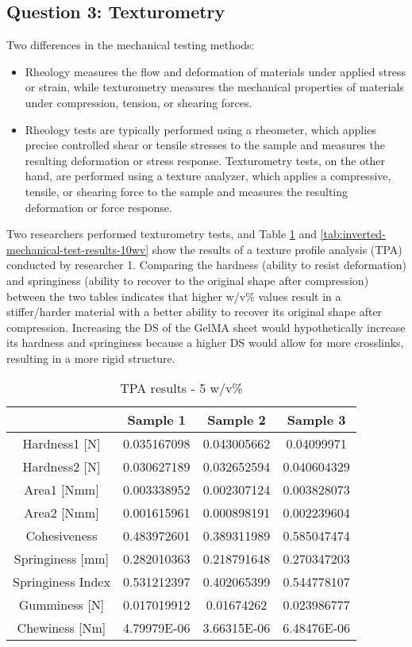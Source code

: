 \subsection{Question 3: Texturometry}

Two differences in the mechanical testing methods:
\begin{itemize}
    \item[1.] Rheology measures the flow and deformation of materials under applied stress or strain, while texturometry 
    measures the mechanical properties of materials under compression, tension, or shearing forces.
    \item[2.] Rheology tests are typically performed using a rheometer, which applies precise controlled shear or tensile 
    stresses to the sample and measures the resulting deformation or stress response. Texturometry tests, on the other 
    hand, are performed using a texture analyzer, which applies a compressive, tensile, or shearing force to the sample and measures the resulting deformation or force response.
\end{itemize}

Two researchers performed texturometry tests, and Table \ref{tab:inverted-mechanical-test-results} and \ref{tab:inverted-mechanical-test-results-10wv} show the results of a texture profile analysis (TPA) conducted by researcher 1. Comparing the hardness (ability to resist deformation) and springiness (ability to recover to the original shape after compression) between the two tables indicates that higher w/v\% values result in a stiffer/harder material with a better ability to recover its original shape after compression. Increasing the DS of the GelMA sheet would hypothetically increase its hardness and springiness because a higher DS would allow for more crosslinks, resulting in a more rigid structure.

\begin{table}[ht]
    \centering
    \begin{tabular}{c|ccc}
    \hline
    & Sample 1 & Sample 2 & Sample 3 \\ \hline
    Hardness1 [N] & 0.035167098 & 0.043005662 & 0.04099971 \\ 
    Hardness2 [N] & 0.030627189 & 0.032652594 & 0.040604329 \\ 
    Area1 [Nmm] & 0.003338952 & 0.002307124 & 0.003828073 \\ 
    Area2 [Nmm] & 0.001615961 & 0.000898191 & 0.002239604 \\ 
    Cohesiveness & 0.483972601 & 0.389311989 & 0.585047474 \\ 
    Springiness [mm] & 0.282010363 & 0.218791648 & 0.270347203 \\ 
    Springiness Index & 0.531212397 & 0.402065399 & 0.544778107 \\ 
    Gumminess [N] & 0.017019912 & 0.01674262 & 0.023986777 \\ 
    Chewiness [Nm] & 4.79979E-06 & 3.66315E-06 & 6.48476E-06 \\
    \end{tabular}
    \caption{TPA results - 5 w/v\%}
    \label{tab:inverted-mechanical-test-results}
\end{table}

